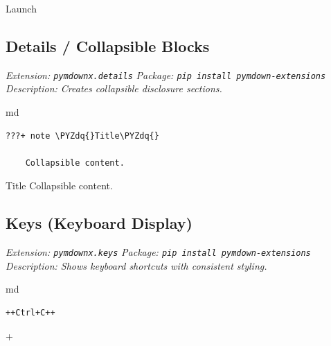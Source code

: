 \documentclass[a4paper,twoside]{article}
\begin{document}
{ Launch}\par

\subsection{Details / Collapsible Blocks}\label{details-collapsible-blocks}

\emph{Extension: \texttt{pymdownx.details}}
\emph{Package: \texttt{pip install pymdown-\allowbreak{}extensions}}
\emph{Description: Creates collapsible disclosure sections.}

\begin{code}{md}{}{}
\begin{Verbatim}[commandchars=\\\{\},breaklines, breakanywhere, commandchars=\\\{\}]
???+ note \PYZdq{}Title\PYZdq{}

    Collapsible content.
\end{Verbatim}
\end{code}
\begin{displayquote}

\begin{callout}{Title}
Collapsible content.
\end{callout}

\end{displayquote}
\subsection{Keys (Keyboard Display)}\label{keys-keyboard-display}

\emph{Extension: \texttt{pymdownx.keys}}
\emph{Package: \texttt{pip install pymdown-\allowbreak{}extensions}}
\emph{Description: Shows keyboard shortcuts with consistent styling.}

\begin{code}{md}{}{}
\begin{Verbatim}[commandchars=\\\{\},breaklines, breakanywhere, commandchars=\\\{\}]
++Ctrl+C++
\end{Verbatim}
\end{code}
\begin{displayquote}

+

\end{displayquote}
\end{document}
